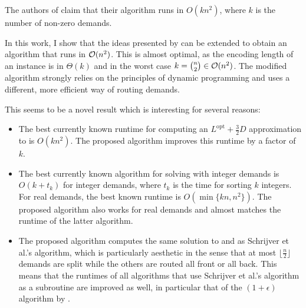 The authors of \cite{schrijver99} claim that their algorithm runs in $O(k n^2)$, where $k$ is the number of non-zero demands.

In this work, I show that the ideas presented by \citet{schrijver99} can be extended to obtain an algorithm that runs in $\mathcal{O}(n^2)$.
This is almost optimal, as the encoding length of an instance is in $\Theta(k)$ and in the worst case $k = \binom{n}{2} \in \mathcal{O}(n^2)$.
The modified algorithm strongly relies on the principles of dynamic programming and uses a different, more efficient way of routing demands.


This seems to be a novel result which is interesting for several reasons:
\begin{itemize}
	\item The best currently known runtime for computing an $L^\mathrm{opt} + \frac{3}{2}D$ approximation to \RL is $O(k n^2)$.
	The proposed algorithm improves this runtime by a factor of $k$.
	\item The best currently known algorithm for solving \RRL with integer demands is $O(k + t_k)$ for integer demands, where $t_k$ is the time for sorting $k$ integers.
	For real demands, the best known runtime is $O(\min\{kn, n^2\})$.
	The proposed algorithm also works for real demands and almost matches the runtime of the latter algorithm.
	\item The proposed algorithm computes the same solution to \RL and \RRL as Schrijver et al.'s algorithm, which is particularly aesthetic in the sense that at most $\lfloor\frac{n}{2}\rfloor$ demands are split while the others are routed all front or all back.
	This means that the runtimes of all algorithms that use Schrijver et al.'s algorithm as a subroutine are improved as well, in particular that of the $(1 + \epsilon)$ algorithm by \citet{khanna97}.
\end{itemize}
